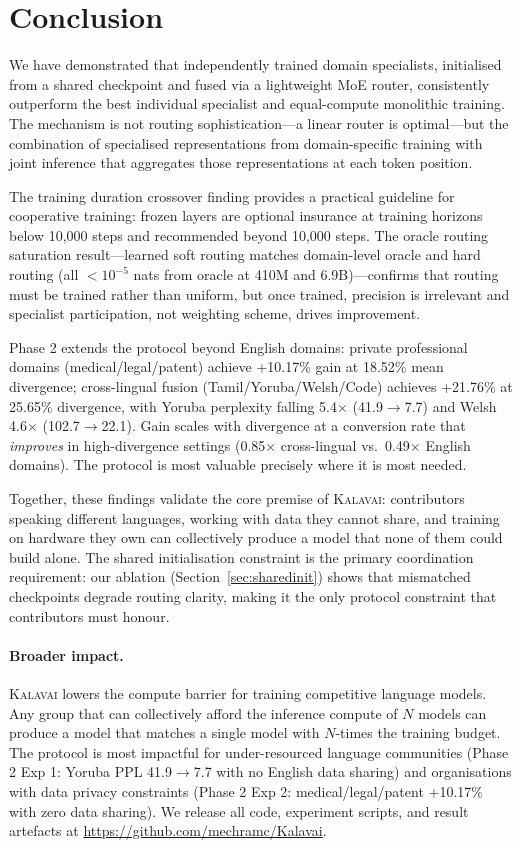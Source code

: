 \documentclass{article}
\newcommand{\kalavai}{\textsc{Kalavai}\xspace}
\begin{document}
\section{Conclusion}
\label{sec:conclusion}

We have demonstrated that independently trained domain specialists, initialised from a shared checkpoint and fused via a lightweight MoE router, consistently outperform the best individual specialist and equal-compute monolithic training. The mechanism is not routing sophistication---a linear router is optimal---but the combination of specialised representations from domain-specific training with joint inference that aggregates those representations at each token position.

The training duration crossover finding provides a practical guideline for cooperative training: frozen layers are optional insurance at training horizons below 10,000 steps and recommended beyond 10,000 steps. The oracle routing saturation result---learned soft routing matches domain-level oracle and hard routing (all ${<}10^{-5}$ nats from oracle at 410M and 6.9B)---confirms that routing must be trained rather than uniform, but once trained, precision is irrelevant and specialist participation, not weighting scheme, drives improvement.

Phase 2 extends the protocol beyond English domains: private professional domains (medical/legal/patent) achieve +10.17\% gain at 18.52\% mean divergence; cross-lingual fusion (Tamil/Yoruba/Welsh/Code) achieves +21.76\% at 25.65\% divergence, with Yoruba perplexity falling 5.4$\times$ (41.9$\to$7.7) and Welsh 4.6$\times$ (102.7$\to$22.1). Gain scales with divergence at a conversion rate that \emph{improves} in high-divergence settings (0.85$\times$ cross-lingual vs.\ 0.49$\times$ English domains). The protocol is most valuable precisely where it is most needed.

Together, these findings validate the core premise of \kalavai: contributors speaking different languages, working with data they cannot share, and training on hardware they own can collectively produce a model that none of them could build alone. The shared initialisation constraint is the primary coordination requirement: our ablation (Section~\ref{sec:sharedinit}) shows that mismatched checkpoints degrade routing clarity, making it the only protocol constraint that contributors must honour.

\paragraph{Broader impact.} \kalavai lowers the compute barrier for training competitive language models. Any group that can collectively afford the inference compute of $N$ models can produce a model that matches a single model with $N$-times the training budget. The protocol is most impactful for under-resourced language communities (Phase 2 Exp 1: Yoruba PPL 41.9$\to$7.7 with no English data sharing) and organisations with data privacy constraints (Phase 2 Exp 2: medical/legal/patent +10.17\% with zero data sharing). We release all code, experiment scripts, and result artefacts at \url{https://github.com/mechramc/Kalavai}.
\end{document}
